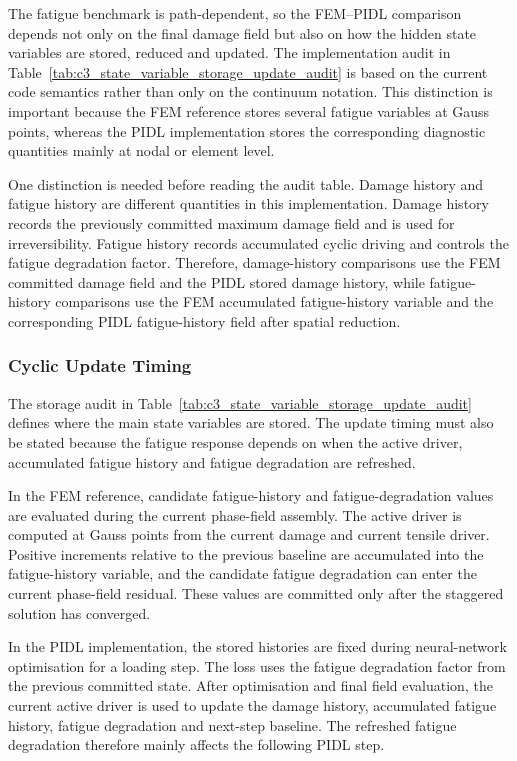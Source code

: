 The fatigue benchmark is path-dependent, so the FEM--PIDL comparison depends not only on the final damage field but also on how the hidden state variables are stored, reduced and updated. The implementation audit in Table~\ref{tab:c3_state_variable_storage_update_audit} is based on the current code semantics rather than only on the continuum notation. This distinction is important because the FEM reference stores several fatigue variables at Gauss points, whereas the PIDL implementation stores the corresponding diagnostic quantities mainly at nodal or element level.

One distinction is needed before reading the audit table. Damage history and fatigue history are different quantities in this implementation. Damage history records the previously committed maximum damage field and is used for irreversibility. Fatigue history records accumulated cyclic driving and controls the fatigue degradation factor. Therefore, damage-history comparisons use the FEM committed damage field and the PIDL stored damage history, while fatigue-history comparisons use the FEM accumulated fatigue-history variable and the corresponding PIDL fatigue-history field after spatial reduction.

\subsubsection{Cyclic Update Timing}
\label{subsec:c3_cyclic_update_timing}

The storage audit in Table~\ref{tab:c3_state_variable_storage_update_audit} defines where the main state variables are stored. The update timing must also be stated because the fatigue response depends on when the active driver, accumulated fatigue history and fatigue degradation are refreshed.

In the FEM reference, candidate fatigue-history and fatigue-degradation values are evaluated during the current phase-field assembly. The active driver is computed at Gauss points from the current damage and current tensile driver. Positive increments relative to the previous baseline are accumulated into the fatigue-history variable, and the candidate fatigue degradation can enter the current phase-field residual. These values are committed only after the staggered solution has converged.

In the PIDL implementation, the stored histories are fixed during neural-network optimisation for a loading step. The loss uses the fatigue degradation factor from the previous committed state. After optimisation and final field evaluation, the current active driver is used to update the damage history, accumulated fatigue history, fatigue degradation and next-step baseline. The refreshed fatigue degradation therefore mainly affects the following PIDL step.




